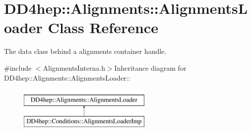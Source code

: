 \hypertarget{class_d_d4hep_1_1_alignments_1_1_alignments_loader}{
\section{DD4hep::Alignments::AlignmentsLoader Class Reference}
\label{class_d_d4hep_1_1_alignments_1_1_alignments_loader}
}


The data class behind a alignments container handle.  


{\ttfamily \#include $<$AlignmentsInterna.h$>$}Inheritance diagram for DD4hep::Alignments::AlignmentsLoader::\begin{figure}[H]
\begin{center}
\leavevmode
\includegraphics[height=2cm]{class_d_d4hep_1_1_alignments_1_1_alignments_loader}
\end{center}
\end{figure}
